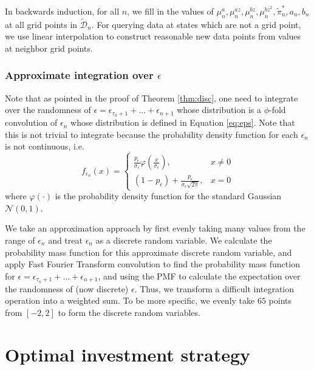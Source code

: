 In backwards induction, for all $n$, we fill in the values of $\mu_n^a,\mu_n^{az},\mu_n^{bz},\mu_n^{bz^2},\tilde\pi_n^*,\allowbreak a_n,b_n$ at all grid points in $\tilde{\mathcal D}_n$. For querying data at states which are not a grid point, we use linear interpolation \cite{meijering2002chronology} to construct reasonable new data points from values at neighbor grid points. 

\subsubsection{Approximate integration over $\epsilon$}

Note that as pointed in the proof of Theorem \ref{thm:disc}, one need to integrate over the randomness of $\epsilon=\epsilon_{\tau_n+1}+\ldots+\epsilon_{n+1}$ whose distribution is a $\phi$-fold convolution of $\epsilon_n$ whose distribution is defined in Equation \eqref{eq:eps}. Note that this is not trivial to integrate because the probability density function for each $\epsilon_n$ is not continuous, i.e.$$f_{\epsilon_n}(x)=\begin{cases}
    \frac{p_\epsilon}{\sigma_\epsilon}\varphi\left(\frac{x}{\sigma_\epsilon}\right), \qquad &x\neq 0\\
    (1-p_\epsilon)+\frac{p_\epsilon}{\sigma_\epsilon\sqrt{2\pi}}, &x=0
\end{cases}$$ where $\varphi(\cdot)$ is the probability density function for the standard Gaussian $\mathcal N(0,1)$.

We take an approximation approach by first evenly taking many values from the range of $\epsilon_n$ and treat $\epsilon_n$ as a discrete random variable. We calculate the probability mass function for this approximate discrete random variable, and apply Fast Fourier Transform convolution to find the probability mass function for $\epsilon=\epsilon_{\tau_n+1}+\ldots+\epsilon_{n+1}$, and using the PMF to calculate the expectation over the randomness of (now discrete) $\epsilon$. Thus, we transform a difficult integration operation into a weighted sum. To be more specific, we evenly take $65$ points from $[-2,2]$ to form the discrete random variables.

\section{Optimal investment strategy}

